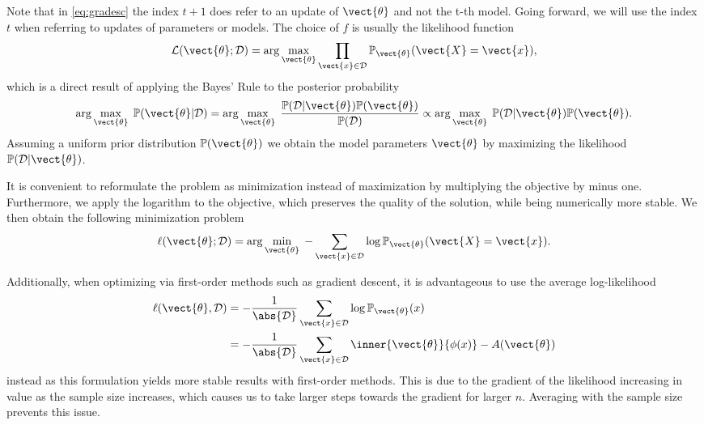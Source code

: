     Note that in \eq\ref{eq:gradesc} the index $t+1$ does refer to an update of $\vect{\theta}$ and not the t-th model.
    Going forward, we will use the index $t$ when referring to updates of parameters or models. 
    The choice of $f$ is usually the likelihood function
    \begin{equation}
        \label{eq:likelihood}
        \mathcal{L}(\vect{\theta} ; \mathcal{D}) = \arg\max_{\vect{\theta}}\prod_{\vect{x} \in \mathcal{D}}  \mathbb{P}_{\vect{\theta}}(\vect{X} = \vect{x}),
    \end{equation}
    which is a direct result of applying the Bayes' Rule to the posterior probability
    \begin{equation}
        \arg\max_{\vect{\theta}} \; \mathbb{P}(\vect{\theta} \lvert \mathcal{D}) = \arg\max_{\vect{\theta}} \; \frac{\mathbb{P}(\mathcal{D} \lvert \vect{\theta}) \mathbb{P}(\vect{\theta})}{\mathbb{P}(\mathcal{D})} \propto   \arg\max_{\vect{\theta}} \; \mathbb{P}(\mathcal{D} \lvert \vect{\theta}) \mathbb{P}(\vect{\theta}).
    \end{equation}
    Assuming a uniform prior distribution $\mathbb{P}(\vect{\theta})$ we obtain the model parameters $\vect{\theta}$ by maximizing the likelihood $\mathbb{P}(\mathcal{D} \lvert \vect{\theta})$.

    It is convenient to reformulate the problem as minimization instead of maximization by multiplying the objective by minus one. 
    Furthermore, we apply the logarithm to the objective, which preserves the quality of the solution, while being numerically more stable.
    We then obtain the following minimization problem
    \begin{equation}
        \label{eq:likelihood:log}
        \ell(\vect{\theta} ; \mathcal{D}) = \arg\min_{\vect{\theta}} \; - \sum_{\vect{x} \in \mathcal{D}}  \log \mathbb{P}_{\vect{\theta}}(\vect{X} = \vect{x}).
    \end{equation}

    Additionally, when optimizing via first-order methods such as gradient descent, it is advantageous to use the average log-likelihood
    \begin{equation}
        \label{eq:likelihood:expfam}
        \begin{split}
        \ell(\vect{\theta}, \mathcal{D}) &= - \frac{1}{\abs{\mathcal{D}}} \sum_{\vect{x} \in \mathcal{D}} \log \mathbb{P}_{\vect{\theta}}(x)\\
        &= - \frac{1}{\abs{\mathcal{D}}} \sum_{\vect{x} \in \mathcal{D}} \inner{\vect{\theta}}{\phi(x)} - A(\vect{\theta})
    \end{split}
    \end{equation}
    instead as this formulation yields more stable results with first-order methods.
    This is due to the gradient of the likelihood increasing in value as the sample size increases, which causes us to take larger steps towards the gradient for larger $n$.
    Averaging with the sample size prevents this issue.


